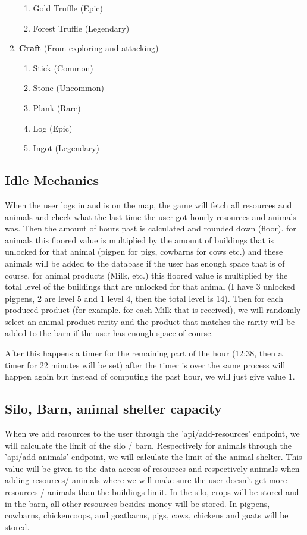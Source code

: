 \documentclass[12pt]{article}
\begin{document}
\begin{enumerate}
\begin{enumerate}
        \item Gold Truffle (Epic)
        \item Forest Truffle (Legendary)
    \end{enumerate}
    \item \textbf{Craft} (From exploring and attacking)
    \begin{enumerate}
        \item Stick (Common)
        \item Stone (Uncommon)
        \item Plank (Rare)
        \item Log (Epic)
        \item Ingot (Legendary)
    \end{enumerate}
\end{enumerate}

\subsection{Idle Mechanics}
When the user logs in and is on the map, the game will fetch all resources and animals and check what the last time the user got hourly resources and animals was.
Then the amount of hours past is calculated and rounded down (floor).
for animals this floored value is multiplied by the amount of buildings that is unlocked for that animal (pigpen for pigs, cowbarns for cows etc.) and these animals will be added to the database if the user has enough space that is of course.
for animal products (Milk, etc.) this floored value is multiplied by the total level of the buildings that are unlocked for that animal (I have 3 unlocked pigpens, 2 are level 5 and 1 level 4, then the total level is 14).
Then for each produced product (for example. for each Milk that is received),
we will randomly select an animal product rarity and the product that matches the rarity will be added to the barn if the user has enough space of course.

After this happens a timer for the remaining part of the hour (12:38, then a timer for 22 minutes will be set) after the timer is over the same process will happen again but instead of computing the past hour, we will just give value 1.

\subsection{Silo, Barn, animal shelter capacity}
When we add resources to the user through the 'api/add-resources' endpoint, we will calculate the limit of the silo / barn.
Respectively for animals through the 'api/add-animals' endpoint, we will calculate the limit of the animal shelter.
This value will be given to the data access of resources and respectively animals when adding resources/ animals where we will make sure the user doesn't get more resources / animals than the buildings limit.
In the silo, crops will be stored and in the barn, all other resources besides money will be stored.
In pigpens, cowbarns, chickencoops, and goatbarns, pigs, cows, chickens and goats will be stored.
\end{document}
